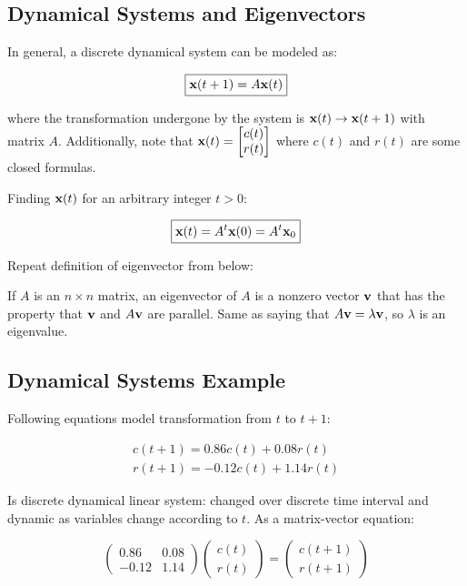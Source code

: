 \subsection{Dynamical Systems and Eigenvectors}

In general, a discrete dynamical system can be modeled as:

\[\boxed{\textbf{x}(t+1)=A\textbf{x}(t)}\]

where the transformation undergone by the system is $\textbf{x}(t)\rightarrow\textbf{x}(t+1)$ with matrix $A$.
Additionally, note that $\textbf{x}(t)=\begin{bmatrix}c(t)\\r(t)\end{bmatrix}$ where $c(t)$ and $r(t)$ are some closed formulas.

Finding $\textbf{x}(t)$ for an arbitrary integer $t>0$:

\[\boxed{\textbf{x}(t)=A^t\textbf{x}(0)=A^t\textbf{x}_0}\]

Repeat definition of eigenvector from below:

\begin{framed}
    If $A$ is an $n\times n$ matrix, an eigenvector of $A$ is a nonzero vector $\textbf{v}$
    that has the property that $\textbf{v}$ and $A\textbf{v}$ are parallel.
    Same as saying that $A\textbf{v}=\lambda\textbf{v}$, so $\lambda$ is an eigenvalue.
\end{framed}

\subsection{Dynamical Systems Example}

Following equations model transformation from $t$ to $t+1$:

\[\boxed{
    \begin{array}{l}
        c(t+1)=0.86 c(t)+0.08 r(t) \\
        r(t+1)=-0.12 c(t)+1.14 r(t)
        \end{array}
}\]

Is discrete dynamical linear system: changed over discrete time interval and dynamic as
variables change according to $t$. As a matrix-vector equation:

\[\left(\begin{array}{cc}
    0.86 & 0.08 \\
    -0.12 & 1.14
    \end{array}\right)\left(\begin{array}{l}
    c(t) \\
    r(t)
    \end{array}\right)=\left(\begin{array}{l}
    c(t+1) \\
    r(t+1)
    \end{array}\right)\]

